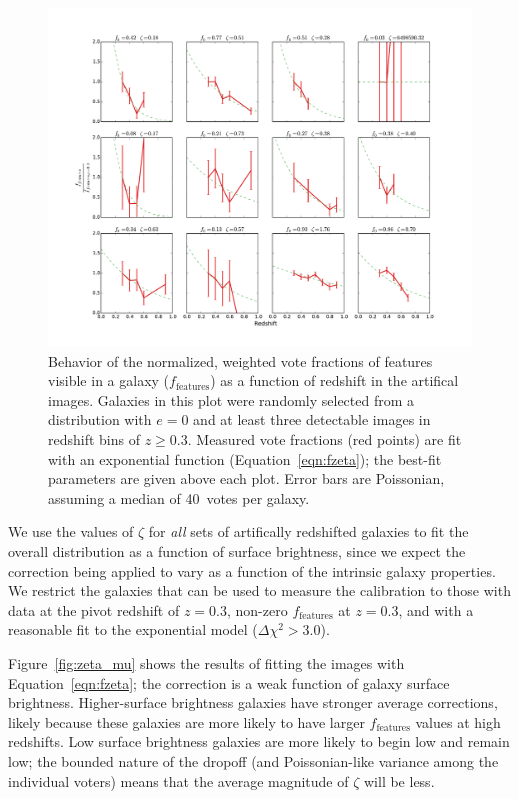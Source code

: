 \documentclass[twocolumn]{aastex6}
\begin{document}
\begin{figure}
\center
\includegraphics[width=\textwidth]{figures/zeta_examples.pdf}
\caption{Behavior of the normalized, weighted vote fractions of features visible in a galaxy ($f_\textrm{features}$) as a function of redshift in the artifical \ferengi{} images. Galaxies in this plot were randomly selected from a distribution with $e=0$ and at least three detectable images in redshift bins of $z\ge0.3$. Measured vote fractions (red points) are fit with an exponential function (Equation~\ref{eqn:fzeta}); the best-fit parameters are given above each plot. Error bars are Poissonian, assuming a median of 40~votes per galaxy.}
\label{fig:zeta_examples}
\end{figure}

We use the values of $\zeta$ for \emph{all} sets of artifically redshifted galaxies to fit the overall distribution as a function of surface brightness, since we expect the correction being applied to vary as a function of the intrinsic galaxy properties. We restrict the galaxies that can be used to measure the calibration to those with data at the pivot redshift of $z=0.3$, non-zero $f_\textrm{features}$ at $z=0.3$, and with a reasonable fit to the exponential model ($\Delta \chi^2 > 3.0$). 

Figure~\ref{fig:zeta_mu} shows the results of fitting the \ferengi{} images with Equation~\ref{eqn:fzeta}; the correction is a weak function of galaxy surface brightness. Higher-surface brightness galaxies have stronger average corrections, likely because these galaxies are more likely to have larger $f_\textrm{features}$ values at high redshifts. Low surface brightness galaxies are more likely to begin low and remain low; the bounded nature of the dropoff (and Poissonian-like variance among the individual voters) means that the average magnitude of $\zeta$ will be less. 
\end{document}
